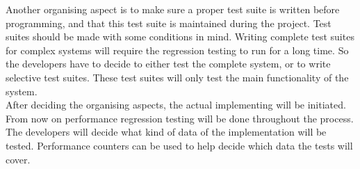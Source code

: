 Another organising aspect is to make sure a proper test suite is written before programming, and that this test suite is maintained during the project. Test suites should be made with some conditions in mind. Writing complete test suites for complex systems will require the regression testing to run for a long time. \cite{rothermel2001prioritizing} So the developers have to decide to either test the complete system, or to write selective test suites. These test suites will only test the main functionality of the system. \\
After deciding the organising aspects, the actual implementing will be initiated. From now on performance regression testing will be done throughout the process. The developers will decide what kind of data of the implementation will be tested. Performance counters can be used to help decide which data the tests will cover.
